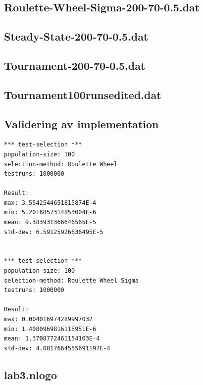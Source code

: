 \documentclass[titlepage, a4paper, 12pt]{article}
\begin{document}
\subsection{Roulette-Wheel-Sigma-200-70-0.5.dat}\label{Roulette-Wheel-Sigma-200-70-0.5.dat}
\begin{footnotesize}
  
\end{footnotesize}

\subsection{Steady-State-200-70-0.5.dat}\label{Steady-State-200-70-0.5.dat}
\begin{footnotesize}
  
\end{footnotesize}

\subsection{Tournament-200-70-0.5.dat}\label{Tournament-200-70-0.5.dat}
\begin{footnotesize}
  
\end{footnotesize}

\subsection{Tournament100runsedited.dat}\label{Tournament100runsedited.dat}
\begin{footnotesize}
  
\end{footnotesize}

\subsection{Validering av implementation}\label{app:validering}
\begin{footnotesize}
\begin{verbatim}
*** test-selection ***
population-size: 100
selection-method: Roulette Wheel
testruns: 1000000

Result:
max: 3.5542544651815874E-4
min: 5.2016857314853004E-6
mean: 9.383931366646565E-5
std-dev: 6.59125926636495E-5


*** test-selection ***
population-size: 100
selection-method: Roulette Wheel Sigma
testruns: 1000000

Result:
max: 0.004016974289997032
min: 1.4080969816115951E-6
mean: 1.3708772461154103E-4
std-dev: 4.0817664555691197E-4
\end{verbatim}
\end{footnotesize}

\subsection{lab3.nlogo}\label{app:lab3.nlogo}
\begin{footnotesize}
  
\end{footnotesize}
\end{document}
